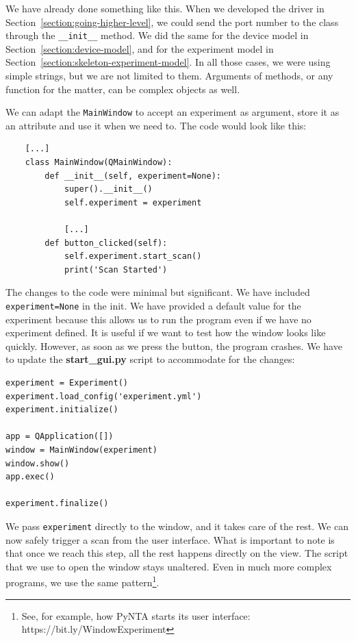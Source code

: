 We have already done something like this. When we developed the driver in Section~\ref{section:going-higher-level}, we could send the port number to the class through the \texttt{\_\_init\_\_} method. We did the same for the device model in Section~\ref{section:device-model}, and for the experiment model in Section~\ref{section:skeleton-experiment-model}. In all those cases, we were using simple strings, but we are not limited to them. Arguments of methods, or any function for the matter, can be complex objects as well.

We can adapt the \texttt{MainWindow} to accept an experiment as argument, store it as an attribute and use it when we need to. The code would look like this:

\begin{verbatim}
    [...]
    class MainWindow(QMainWindow):
        def __init__(self, experiment=None):
            super().__init__()
            self.experiment = experiment

            [...]
        def button_clicked(self):
            self.experiment.start_scan()
            print('Scan Started')
\end{verbatim}

The changes to the code were minimal but significant. We have included \texttt{experiment=None} in the init. We have provided a default value for the experiment because this allows us to run the program even if we have no experiment defined. It is useful if we want to test how the window looks like quickly. However, as soon as we press the button, the program crashes. We have to update the \textbf{start\_gui.py} script to accommodate for the changes:

\begin{verbatim}
experiment = Experiment()
experiment.load_config('experiment.yml')
experiment.initialize()

app = QApplication([])
window = MainWindow(experiment)
window.show()
app.exec()

experiment.finalize()
\end{verbatim}

We pass \texttt{experiment} directly to the window, and it takes care of the rest. We can now safely trigger a scan from the user interface. What is important to note is that once we reach this step, all the rest happens directly on the view. The script that we use to open the window stays unaltered. Even in much more complex programs, we use the same pattern\footnote{See, for example, how PyNTA starts its user interface: https://bit.ly/WindowExperiment}.

